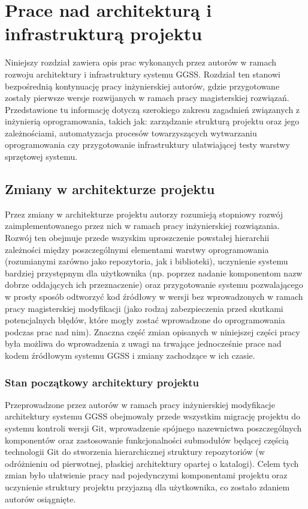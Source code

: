 \chapter{Prace nad architekturą i infrastrukturą projektu}
\label{cha:infra}


Niniejszy rozdział zawiera opis prac wykonanych przez autorów w ramach rozwoju architektury i infrastruktury systemu GGSS. Rozdział ten stanowi bezpośrednią kontynuację pracy inżynierskiej autorów, gdzie przygotowane zostały pierwsze wersje rozwijanych w ramach pracy magisterskiej rozwiązań. Przedstawione tu informację dotyczą szerokiego zakresu zagadnień związanych z inżynierią oprogramowania, takich jak: zarządzanie strukturą projektu oraz jego zależnościami, automatyzacja procesów towarzyszących wytwarzaniu oprogramowania czy przygotowanie infrastruktury ułatwiającej testy warstwy sprzętowej systemu. 

\section{Zmiany w architekturze projektu}
Przez zmiany w architekturze projektu autorzy rozumieją stopniowy rozwój zaimplementowanego przez nich w ramach pracy inżynierskiej rozwiązania. Rozwój ten obejmuje przede wszyskim uproszczenie powstałej hierarchii zależności między poszczególnymi elementami warstwy oprogramowania (rozumianymi zarówno jako repozytoria, jak i biblioteki), uczynienie systemu bardziej przystępnym dla użytkownika (np. poprzez nadanie komponentom nazw dobrze oddających ich przeznaczenie) oraz przygotowanie systemu pozwalającego w prosty sposób odtworzyć kod źródłowy w wersji bez wprowadzonych w ramach pracy magisterskiej modyfikacji (jako rodzaj zabezpieczenia przed skutkami potencjalnych błędów, które mogły zostać wprowadzone do oprogramowania podczas prac nad nim). Znaczna część zmian opisanych w niniejszej części pracy była możliwa do wprowadzenia z uwagi na trwające jednocześnie prace nad kodem źródłowym systemu GGSS i zmiany zachodzące w ich czasie.

\subsection{Stan początkowy architektury projektu}
Przeprowadzone przez autorów w ramach pracy inżynierskiej modyfikacje architektury systemu GGSS obejmowały przede wszystkim migrację projektu do systemu kontroli wersji Git, wprowadzenie spójnego nazewnictwa poszczególnych komponentów oraz zastosowanie funkcjonalności submodułów będącej częścią technologii Git do stworzenia hierarchicznej struktury repozytoriów (w odróżnieniu od pierwotnej, płaskiej architektury opartej o katalogi). Celem tych zmian było ułatwienie pracy nad pojedynczymi komponentami projektu oraz uczynienie struktury projektu przyjazną dla użytkownika, co zostało zdaniem autorów osiągnięte. 

